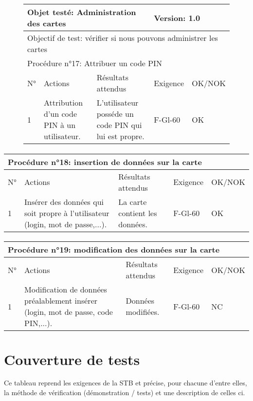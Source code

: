 \documentclass[a4paper,11pt,french]{article}
\begin{document}
\begin{figure}[!h]
\begin{tabular}{|p{1cm}|p{5cm}|p{5cm}|p{2cm}|p{2cm}|}
\hline
\multicolumn{3}{|l|}{Objet testé: Administration des cartes} & \multicolumn{2}{|l|}{Version: 1.0} \\
\hline
\multicolumn{5}{|l|}{Objectif de test: vérifier si nous pouvons administrer les cartes} \\
\hline
\multicolumn{5}{|l|}{Procédure n°17: Attribuer un code PIN} \\
\hline
N° & Actions & Résultats attendus & Exigence & OK/NOK \\
\hline
1 & Attribution d'un code PIN à un utilisateur. & L'utilisateur posséde un code PIN qui lui est propre. & F-Gl-60 & OK \\
\hline
\end{tabular}
\end{figure}

\paragraph{}
\begin{tabular}{|p{1cm}|p{5cm}|p{5cm}|p{2cm}|p{2cm}|}
\hline
\multicolumn{5}{|l|}{Procédure n°18: insertion de données sur la carte} \\
\hline
N° & Actions & Résultats attendus & Exigence & OK/NOK \\
\hline
1 & Insérer des données qui soit propre à l'utilisateur (login, mot de passe,...). & La carte contient les données. & F-Gl-60 & OK \\
\hline
\end{tabular}

\paragraph{}
\begin{tabular}{|p{1cm}|p{5cm}|p{5cm}|p{2cm}|p{2cm}|}
\hline
\multicolumn{5}{|l|}{Procédure n°19: modification des données sur la carte} \\
\hline
N° & Actions & Résultats attendus & Exigence & OK/NOK \\
\hline
1 & Modification de données préalablement insérer (login, mot de passe, code PIN,...). & Données modifiées. & F-Gl-60 & NC \\
\hline
\end{tabular}



\section{Couverture de tests}
Ce tableau reprend les exigences de la STB et précise, pour chacune d’entre elles, la méthode
de vérification (démonstration / tests) et une description de celles ci.
\end{document}
